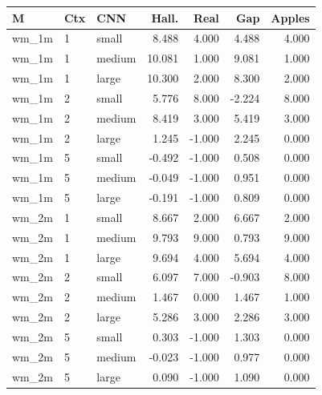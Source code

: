 \begin{tabular}{lllrrrr}
\toprule
M & Ctx & CNN & Hall. & Real & Gap & Apples \\
\midrule
wm\_1m & 1 & small & 8.488 & 4.000 & 4.488 & 4.000 \\
wm\_1m & 1 & medium & 10.081 & 1.000 & 9.081 & 1.000 \\
wm\_1m & 1 & large & 10.300 & 2.000 & 8.300 & 2.000 \\
wm\_1m & 2 & small & 5.776 & 8.000 & -2.224 & 8.000 \\
wm\_1m & 2 & medium & 8.419 & 3.000 & 5.419 & 3.000 \\
wm\_1m & 2 & large & 1.245 & -1.000 & 2.245 & 0.000 \\
wm\_1m & 5 & small & -0.492 & -1.000 & 0.508 & 0.000 \\
wm\_1m & 5 & medium & -0.049 & -1.000 & 0.951 & 0.000 \\
wm\_1m & 5 & large & -0.191 & -1.000 & 0.809 & 0.000 \\
wm\_2m & 1 & small & 8.667 & 2.000 & 6.667 & 2.000 \\
wm\_2m & 1 & medium & 9.793 & 9.000 & 0.793 & 9.000 \\
wm\_2m & 1 & large & 9.694 & 4.000 & 5.694 & 4.000 \\
wm\_2m & 2 & small & 6.097 & 7.000 & -0.903 & 8.000 \\
wm\_2m & 2 & medium & 1.467 & 0.000 & 1.467 & 1.000 \\
wm\_2m & 2 & large & 5.286 & 3.000 & 2.286 & 3.000 \\
wm\_2m & 5 & small & 0.303 & -1.000 & 1.303 & 0.000 \\
wm\_2m & 5 & medium & -0.023 & -1.000 & 0.977 & 0.000 \\
wm\_2m & 5 & large & 0.090 & -1.000 & 1.090 & 0.000 \\
\bottomrule
\end{tabular}
